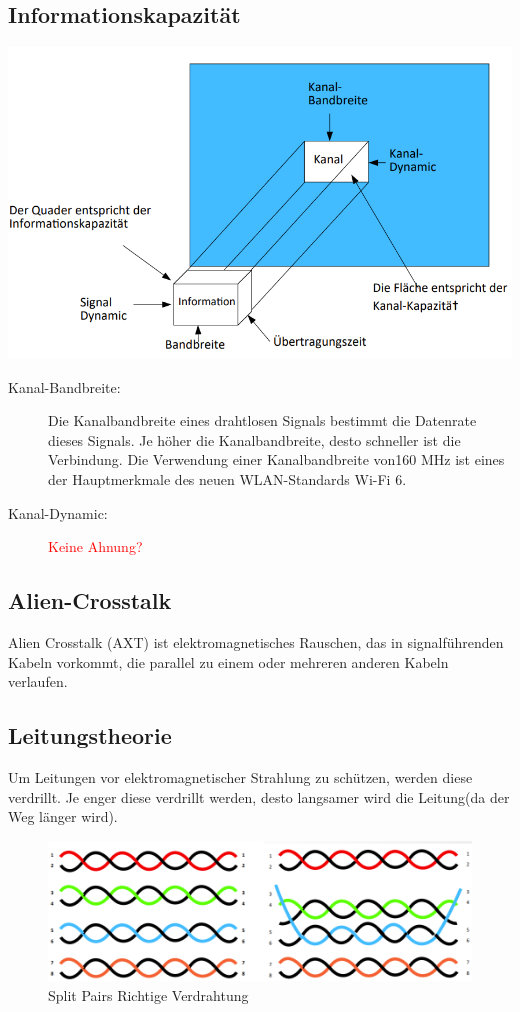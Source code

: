 \documentclass[12pt,a4paper]{article}
\begin{document}
		\subsection{Informationskapazität}
		\includegraphics[width=\textwidth]{Bilder/Informationskapazitaet.png}
		\begin{description}
			\item[Kanal-Bandbreite: ] Die Kanalbandbreite eines drahtlosen Signals bestimmt die Datenrate dieses Signals. Je höher die Kanalbandbreite, desto schneller ist die Verbindung. Die Verwendung einer Kanalbandbreite von160 MHz ist eines der Hauptmerkmale des neuen WLAN-Standards Wi-Fi 6.
			\item[Kanal-Dynamic: ] \textcolor{red}{Keine Ahnung?}
		\end{description}
		
		\subsection{Alien-Crosstalk}
			Alien Crosstalk (AXT) ist elektromagnetisches Rauschen, das in signalführenden Kabeln vorkommt, die parallel zu einem oder mehreren anderen Kabeln verlaufen.

		\subsection{Leitungstheorie}
			Um Leitungen vor elektromagnetischer Strahlung zu schützen, werden diese verdrillt. Je enger diese verdrillt werden, desto langsamer wird die Leitung(da der Weg länger wird).
			\begin{center}
				\begin{figure}[!h]
					\includegraphics[width=\textwidth]{Bilder/verdrillte-kabel.PNG}
					Split Pairs \hspace{0.4\textwidth} Richtige Verdrahtung
				\end{figure}
			\end{center}
\end{document}
